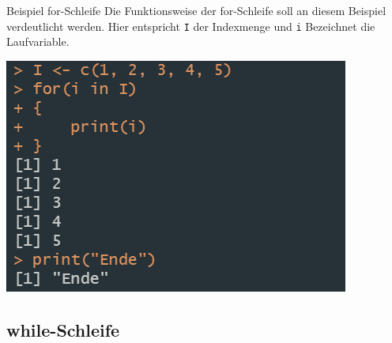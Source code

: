 \documentclass[xcolor=dvipsnames, aspectratio = 169]{beamer}
\begin{document}
\begin{frame}[fragile]{Beispiel for-Schleife}
  Die Funktionsweise der for-Schleife soll an diesem Beispiel verdeutlicht werden. Hier entspricht \verb+I+ der Indexmenge und \verb+i+ Bezeichnet die Laufvariable.\bigskip\\
  \begin{centering}
  \includegraphics[]{for1.png}
  \end{centering}
\end{frame}

\subsection*{while-Schleife}
\end{document}
